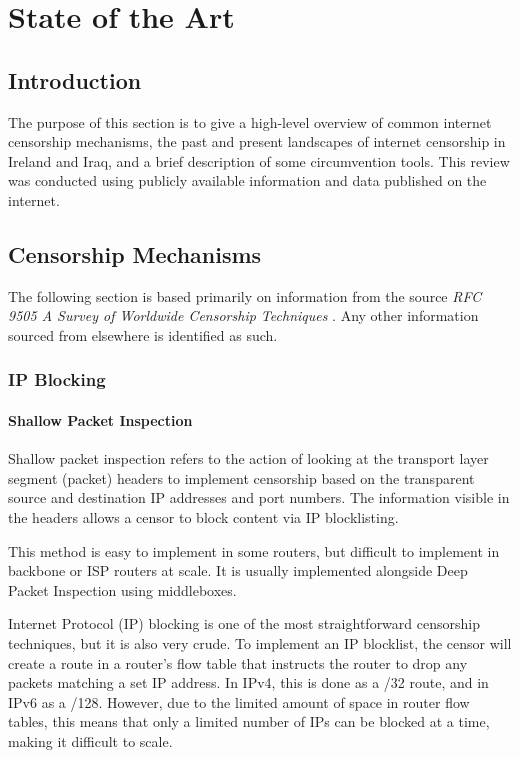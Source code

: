 \chapter{State of the Art}

\section{Introduction}

The purpose of this section is to give a high-level overview of common internet censorship mechanisms, the past and present landscapes of internet censorship in Ireland and Iraq, and a brief description of some circumvention tools. This review was conducted using publicly available information and data published on the internet.

\section{Censorship Mechanisms}

The following section is based primarily on information from the source \textit{RFC 9505
A Survey of Worldwide Censorship Techniques} \cite{rfc9505}. Any other information sourced from elsewhere is identified as such.

\subsection{IP Blocking}

\subsubsection{Shallow Packet Inspection}

Shallow packet inspection refers to the action of looking at the transport layer segment (packet) headers to implement censorship based on the transparent source and destination IP addresses and port numbers. The information visible in the headers allows a censor to block content via IP blocklisting.

This method is easy to implement in some routers, but difficult to implement in backbone or ISP routers at scale. It is usually implemented alongside Deep Packet Inspection using middleboxes.

Internet Protocol (IP) blocking is one of the most straightforward censorship techniques, but it is also very crude. To implement an IP blocklist, the censor will create a route in a router's flow table that instructs the router to drop any packets matching a set IP address. In IPv4, this is done as a /32 route, and in IPv6 as a /128. However, due to the limited amount of space in router flow tables, this means that only a limited number of IPs can be blocked at a time, making it difficult to scale.

